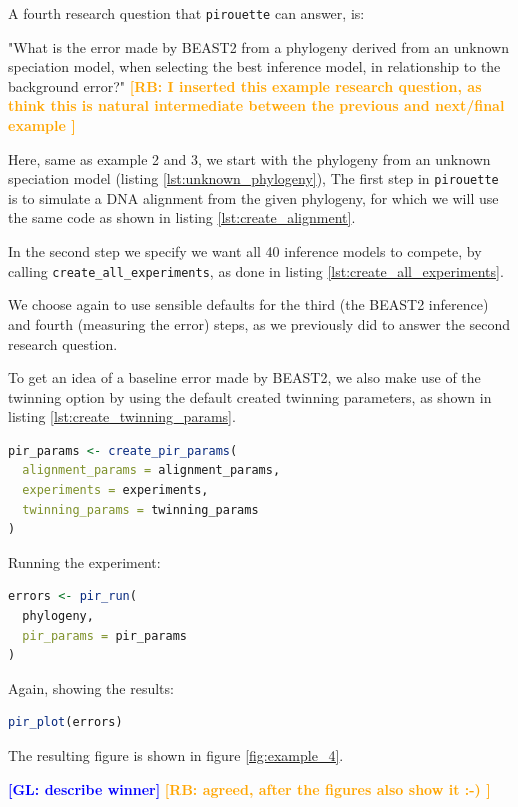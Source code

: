\documentclass{article}
\newcommand{\giovanni}[1]{\textcolor{blue}{\textbf{[GL: #1]}}}
\newcommand{\richel}[1]{\textcolor{orange}{\textbf{[RB: #1]}}}
\begin{document}
A fourth research question that \verb;pirouette; can answer, is:

"What is the error made by BEAST2 from a phylogeny 
derived from an unknown speciation model,
when selecting the best inference model, 
in relationship to the background error?"
\richel{
  I inserted this example research question, 
  as think this is natural intermediate between the 
  previous and next/final example
}

Here, same as example 2 and 3, we start with the phylogeny 
from an unknown speciation model (listing \ref{lst:unknown_phylogeny}), 
The first step in \verb;pirouette; is to simulate a DNA alignment 
from the given phylogeny, for which we will use the same code 
as shown in listing \ref{lst:create_alignment}.

In the second step we specify we want all 
40 inference models to compete, by 
calling \verb;create_all_experiments;,
as done in listing \ref{lst:create_all_experiments}.

We choose again to use sensible defaults for the third (the BEAST2 inference) 
and fourth (measuring the error) steps, 
as we previously did to answer the second research question. 

To get an idea of a baseline error made by BEAST2, 
we also make use of the twinning option by using the
default created twinning parameters, as shown in 
listing \ref{lst:create_twinning_params}.

\begin{lstlisting}[language=R, floatplacement=ht, frame=single]
pir_params <- create_pir_params(
  alignment_params = alignment_params,
  experiments = experiments,
  twinning_params = twinning_params
)
\end{lstlisting}

Running the experiment:

\begin{lstlisting}[language=R, floatplacement=ht, frame=single]
errors <- pir_run(
  phylogeny,
  pir_params = pir_params
)
\end{lstlisting}

Again, showing the results:

\begin{lstlisting}[language=R, floatplacement=ht, frame=single]
pir_plot(errors)
\end{lstlisting}

The resulting figure is shown in figure \ref{fig:example_4}.

\giovanni{describe winner}
\richel{agreed, after the figures also show it :-) }
\end{document}
